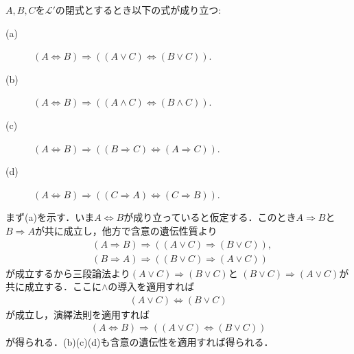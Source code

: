 	\begin{screen}
		\begin{metathm}[同値記号の遺伝性質]\label{metathm:hereditary_of_equivalence}
			$A,B,C$を$\mathcal{L}'$の閉式とするとき以下の式が成り立つ:
			\begin{description}
				\item[(a)] $(A \Longleftrightarrow B) \Longrightarrow ((A \vee C) \Longleftrightarrow (B \vee C))$.
				\item[(b)] $(A \Longleftrightarrow B) \Longrightarrow ((A \wedge C) \Longleftrightarrow (B \wedge C))$.
				\item[(c)] $(A \Longleftrightarrow B) \Longrightarrow ((B \Longrightarrow C) \Longleftrightarrow (A \Longrightarrow C))$.
				
				\item[(d)] $(A \Longleftrightarrow B) \Longrightarrow ((C \Longrightarrow A) \Longleftrightarrow (C \Longrightarrow B))$.
			\end{description}
		\end{metathm}
	\end{screen}
	
	\begin{prf}
		まず(a)を示す．いま$A \Longleftrightarrow B$が成り立っていると仮定する．このとき$A \Longrightarrow B$と
		$B \Longrightarrow A$が共に成立し，他方で含意の遺伝性質より
		\begin{align}
			&(A \Longrightarrow B) \Longrightarrow ((A \vee C) \Longrightarrow (B \vee C)), \\
			&(B \Longrightarrow A) \Longrightarrow ((B \vee C) \Longrightarrow (A \vee C))
		\end{align}
		が成立するから三段論法より$(A \vee C) \Longrightarrow (B \vee C)$と
		$(B \vee C) \Longrightarrow (A \vee C)$が共に成立する．ここに$\wedge$の導入を適用すれば
		\begin{align}
			(A \vee C) \Longleftrightarrow (B \vee C)
		\end{align}
		が成立し，演繹法則を適用すれば
		\begin{align}
			(A \Longleftrightarrow B) \Longrightarrow ((A \vee C) \Longleftrightarrow (B \vee C))
		\end{align}
		が得られる．(b)(c)(d)も含意の遺伝性を適用すれば得られる．
		\QED
	\end{prf}
	
